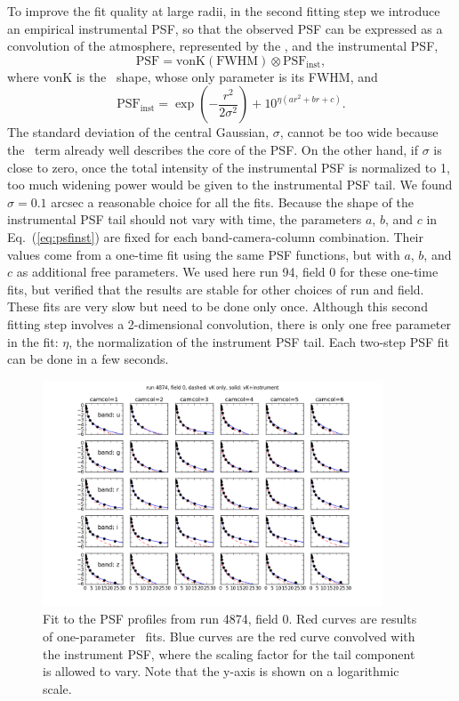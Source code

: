 To improve the fit quality at large radii, in the second fitting step we introduce an
empirical instrumental PSF, so that the observed PSF can be expressed as
a convolution of the atmosphere, represented by the \vk, and
the instrumental PSF,
\begin{equation}
        \textrm{PSF} = \textrm{vonK} (\textrm{FWHM}) \otimes \textrm{PSF}_{\textrm{inst}},
\end{equation} 
where vonK is the \vk~shape, whose only parameter is its FWHM, and
\begin{equation}
        \textrm{PSF}_{\textrm{inst}} = \exp(-\frac{r^2}{2\sigma^2}) + 10^{\eta(ar^2+br+c)}.
\label{eq:psfinst}
\end{equation} 
The standard deviation of the central Gaussian, $\sigma$, cannot be
too wide because the \vk~term already well describes the core of the PSF.
On the other hand, if $\sigma$ is close to zero, once the
total intensity of the instrumental PSF is normalized to 1, too much
widening power would be given to the instrumental PSF tail.
We found $\sigma = 0.1$ arcsec a reasonable choice for all the fits.
Because the shape of the instrumental PSF tail should not vary with
time, the parameters $a$, $b$, and $c$ in Eq.~(\ref{eq:psfinst}) are
fixed for each band-camera-column combination.
Their values come from a one-time fit using the same PSF functions,
but with $a$, $b$, and $c$ as additional free parameters.
We used here run 94, field 0 for these one-time fits, but verified that 
the results are stable for other choices of run and field. 
These fits are very slow but need to be done only once.
Although this second fitting step involves a 2-dimensional convolution,
there is only one free parameter in the fit: $\eta$, the normalization of the
instrument PSF tail. Each two-step PSF fit can be done in a few seconds.


\begin{figure}
\centering
\includegraphics[width=0.9\textwidth]{FIGURES/psffit.png}
\caption{Fit to the PSF profiles from run 4874, field 0. Red curves
  are results of one-parameter \vk~fits. Blue curves are the red
  curve convolved with the instrument PSF, where the scaling factor for
  the tail component is allowed to vary. Note that the y-axis is shown on
  a logarithmic scale.
\label{fig:psffit}}
\end{figure}

